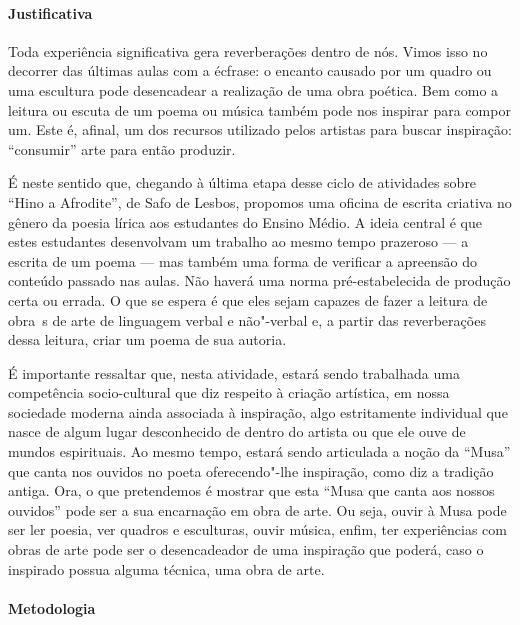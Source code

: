 \documentclass[12pt]{extarticle}
\begin{document}
\paragraph{Justificativa} Toda experiência significativa gera reverberações
dentro de nós. Vimos isso no decorrer das últimas aulas com a écfrase: o 
encanto causado por um quadro ou uma escultura pode desencadear a realização
de uma obra poética. Bem como a leitura ou escuta de um poema ou música 
também pode nos inspirar para compor um. Este é, afinal, um dos recursos
utilizado pelos artistas para buscar inspiração: ``consumir'' arte para
então produzir. 

É neste sentido que, chegando à última etapa desse ciclo de atividades sobre
``Hino a Afrodite'', de Safo de Lesbos, propomos uma oficina de escrita criativa
no gênero da poesia lírica aos estudantes do Ensino Médio. A ideia central
é que estes estudantes desenvolvam um trabalho ao mesmo tempo prazeroso ---
a escrita de um poema --- mas também uma forma de verificar a apreensão do
conteúdo passado nas aulas. Não haverá uma norma pré-estabelecida de
produção certa ou errada. O que se espera é que eles sejam capazes de fazer
a leitura de obra~s de arte de linguagem verbal e não"-verbal e, a partir
das reverberações dessa leitura, criar um poema de sua autoria. 

É importante ressaltar que, nesta atividade, estará sendo trabalhada uma 
competência socio-cultural que diz respeito à criação artística, em nossa
sociedade moderna ainda associada à inspiração, algo estritamente individual
que nasce de algum lugar desconhecido de dentro do artista ou que ele ouve
de mundos espirituais. Ao mesmo tempo, estará sendo articulada a noção da ``Musa''
que canta nos ouvidos no poeta oferecendo"-lhe inspiração, como diz a tradição
antiga. Ora, o que pretendemos é mostrar que esta ``Musa que canta aos nossos
ouvidos'' pode ser a sua encarnação em obra de arte. Ou seja, ouvir à Musa
pode ser ler poesia, ver quadros e esculturas, ouvir música, enfim, ter 
experiências com obras de arte pode ser o desencadeador de uma inspiração
que poderá, caso o inspirado possua alguma técnica, uma obra de arte.

\paragraph{Metodologia}
\end{document}
